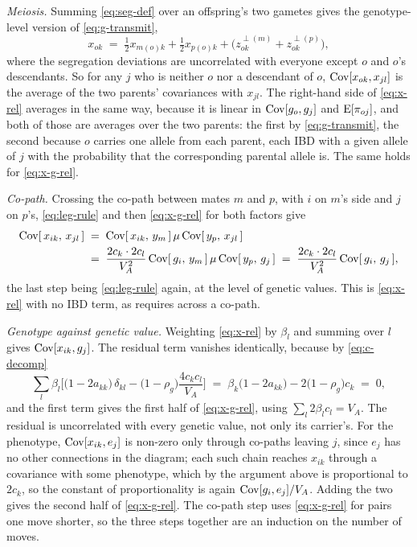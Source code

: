 \documentclass[12pt]{article}
\begin{document}
\emph{Meiosis.}
Summing \eqref{eq:seg-def} over an offspring's two gametes gives the genotype-level version of \eqref{eq:g-transmit},
$$ x_{ok} \;=\; \tfrac12 x_{m(o)k} + \tfrac12 x_{p(o)k} + \big(z^{\perp(m)}_{ok} + z^{\perp(p)}_{ok}\big) , $$
where the segregation deviations are uncorrelated with everyone except $o$ and $o$'s descendants.
So for any $j$ who is neither $o$ nor a descendant of $o$, $\mathrm{Cov}[x_{ok}, x_{jl}]$ is the average of the two parents' covariances with $x_{jl}$.
The right-hand side of \eqref{eq:x-rel} averages in the same way, because it is linear in $\mathrm{Cov}[g_o, g_j]$ and $\mathrm{E}[\pi_{oj}]$, and both of those are averages over the two parents: the first by \eqref{eq:g-transmit}, the second because $o$ carries one allele from each parent, each IBD with a given allele of $j$ with the probability that the corresponding parental allele is.
The same holds for \eqref{eq:x-g-rel}.

\emph{Co-path.}
Crossing the co-path between mates $m$ and $p$, with $i$ on $m$'s side and $j$ on $p$'s, \eqref{eq:leg-rule} and then \eqref{eq:x-g-rel} for both factors give
$$
\begin{aligned}
    \mathrm{Cov}[\,x_{ik},\, x_{jl}\,] \;&=\; \mathrm{Cov}[\,x_{ik},\, y_m\,]\,\mu\,\mathrm{Cov}[\,y_p,\, x_{jl}\,] \\
    \;&=\; \frac{2c_k \cdot 2c_l}{V_A^2}\,\mathrm{Cov}[\,g_i,\, y_m\,]\,\mu\,\mathrm{Cov}[\,y_p,\, g_j\,] \;=\; \frac{2c_k \cdot 2c_l}{V_A^2}\,\mathrm{Cov}[\,g_i,\, g_j\,] ,
\end{aligned}
$$
the last step being \eqref{eq:leg-rule} again, at the level of genetic values.
This is \eqref{eq:x-rel} with no IBD term, as  requires across a co-path.

\emph{Genotype against genetic value.}
Weighting \eqref{eq:x-rel} by $\beta_l$ and summing over $l$ gives $\mathrm{Cov}[x_{ik}, g_j]$.
The residual term vanishes identically, because by \eqref{eq:c-decomp}
$$ \sum_l \beta_l \Big[\big(1 - 2a_{kk}\big)\,\delta_{kl} - \big(1-\rho_g\big)\frac{4c_k c_l}{V_A}\Big]
\;=\; \beta_k\big(1 - 2a_{kk}\big) - 2\big(1-\rho_g\big)c_k \;=\; 0 , $$
and the first term gives the first half of \eqref{eq:x-g-rel}, using $\sum_l 2\beta_l c_l = V_A$.
The residual is uncorrelated with every genetic value, not only its carrier's.
For the phenotype, $\mathrm{Cov}[x_{ik}, e_j]$ is non-zero only through co-paths leaving $j$, since $e_j$ has no other connections in the diagram; each such chain reaches $x_{ik}$ through a covariance with some phenotype, which by the argument above is proportional to $2c_k$, so the constant of proportionality is again $\mathrm{Cov}[g_i, e_j]/V_A$.
Adding the two gives the second half of \eqref{eq:x-g-rel}.
The co-path step uses \eqref{eq:x-g-rel} for pairs one move shorter, so the three steps together are an induction on the number of moves.
\end{document}
